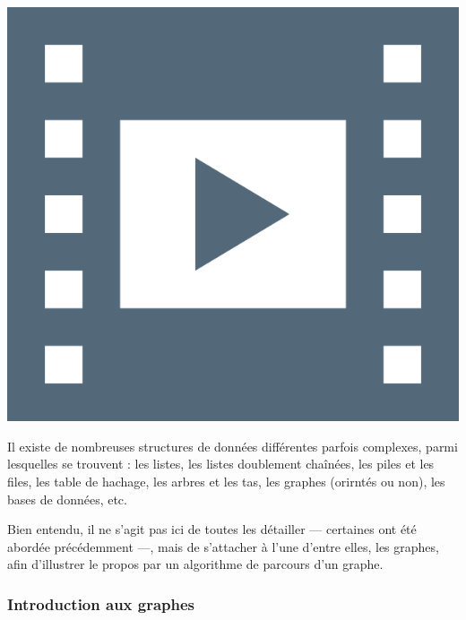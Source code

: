 \begin{marginvideo}
	[\label{vid:VI.4}Algorithmique.]%
	\href{https://www.youtube.com/watch?v=9_MY5c04NXo}%
	  {\includegraphics[width=\marginparwidth]{./Images/Pictograms/film-strip-dark-electric-blue.png}}%
\end{marginvideo}

Il existe de nombreuses structures de données différentes parfois complexes, parmi lesquelles se trouvent : les listes, les listes doublement chaînées, les piles et les files, les table de hachage, les arbres et les tas, les graphes (orirntés ou non), les bases de données, etc.

Bien entendu, il ne s'agit pas ici de toutes les détailler --- certaines ont été abordée précédemment ---, mais de s'attacher à l'une d'entre elles, les graphes, afin d'illustrer le propos par un algorithme de parcours d'un graphe.

\subsubsection[Introduction aux graphes]{Introduction aux graphes}
\label{subsub:VI.1.2.1}

